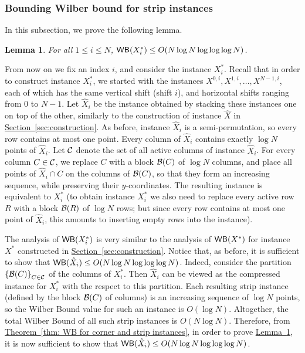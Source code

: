 \documentclass[11pt]{article}
\numberwithin{equation}{section}
\newtheorem{lemma}[theorem]{Lemma}
\theoremstyle{definition}
\theoremstyle{plain}
\newcommand{\expref}[2]{\hyperref[#2]{#1~\ref{#2}}}
\begin{document}
\subsubsection{Bounding Wilber bound for strip instances}
In this subsection, we prove the following lemma.

\begin{lemma}\label{lem: bounding vertical WB for strip}
	For all $1\leq i\leq N$, $\mathsf{WB}(X^*_i)\leq O(N\log N\log\log\log N)$.
\end{lemma}

From now on we fix an index $i$, and consider the instance $X^*_i$. 
Recall that in order to construct instance $X^*_i$, we started with the instances $X^{0,i},X^{1,i},\ldots,X^{N-1,i}$, each of which has the same vertical shift (shift $i$), and horizontal shifts ranging from $0$ to $N-1$. Let $\hat X_i$ be the instance obtained by stacking these instances one on top of the other, similarly to the construction of instance $\hat X$ in \expref{Section}{sec:construction}. As before, instance $\hat X_i$ is a semi-permutation, so every row contains at most one point. Every column of $\hat X_i$ contains exactly $\log N$ points of $\hat X_i$. Let ${\mathcal C}$ denote the set of all active columns of instance $\hat X_i$. For every column $C\in {\mathcal C}$, we replace $C$ with a block ${\mathcal{B}}(C)$ of $\log N$ columns, and place all points of $\hat X_i\cap C$ on the columns of ${\mathcal{B}}(C)$, so that they form an increasing sequence, while preserving their $y$-coordinates. The resulting instance is equivalent to $X^*_i$ (to obtain instance $X^*_i$ we also need to replace every active row $R$ with a block ${\mathcal{B}}(R)$ of $\log N$ rows; but since every row contains at most one point of $\hat X_i$, this amounts to inserting empty rows into the instance).

The analysis of $\mathsf{WB}(X^*_i)$ is very similar to the analysis of $\mathsf{WB}(X^*)$ for instance $X^*$ constructed in \expref{Section}{sec:construction}. Notice that, as before, it is sufficient to show that $\mathsf{WB}(\hat X_i)\leq  O(N\log N\log\log\log N)$.
Indeed, consider the partition $\left\{ {\mathcal{B}}(C) \right\}_{C\in {\mathcal C}}$ of the columns of $X^*_i$. Then $\hat X_i$ can be viewed as the compressed instance for $X^*_i$ with the respect to this partition. Each resulting strip instance (defined by the block ${\mathcal{B}}(C)$ of columns) is an increasing sequence of $\log N$ points, so the Wilber Bound value for such an instance is $O(\log N)$. Altogether, the total Wilber Bound of all such strip instances is $O(N\log N)$. Therefore, from \expref{Theorem}{thm: WB for corner and strip instances}, in order to prove \expref{Lemma}{lem: bounding vertical WB for strip}, it is now sufficient to show that $\mathsf{WB}(\hat X_i)\leq O(N\log N\log\log\log N)$.
\end{document}

